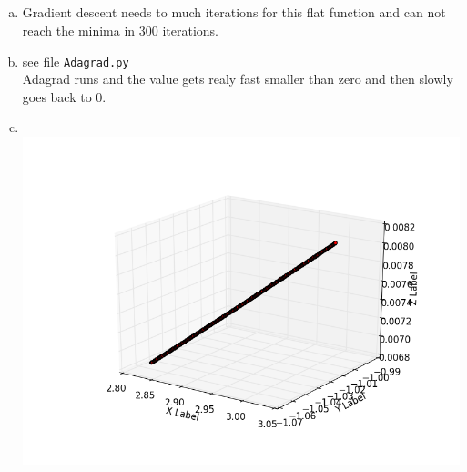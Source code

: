 \documentclass[12pt]{article}
\begin{document}
\subsection{ }

\begin{enumerate}[a)]
    \item 
        Gradient descent needs to much iterations for this flat function and can not reach the minima in 300 iterations.
    \item
        see file \verb!Adagrad.py! \\
        Adagrad runs and the value gets realy fast smaller than zero and then slowly goes back to 0.
    \item \\
        \includegraphics[scale = 0.8]{pictures/figure_3.png}\\

\end{enumerate}
\end{document}
